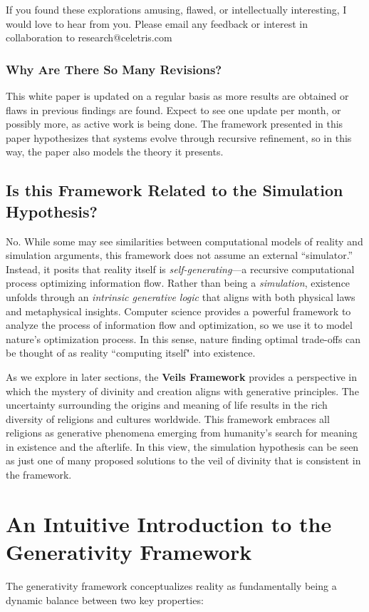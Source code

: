 \documentclass[12pt]{article}
\begin{document}
If you found these explorations amusing, flawed, or intellectually interesting, I would love to hear from you. Please email any feedback or interest in collaboration to research@celetris.com

\subsubsection{Why Are There So Many Revisions?}

This white paper is updated on a regular basis as more results are obtained or flaws in previous findings are found. Expect to see one update per month, or possibly more, as active work is being done. The framework presented in this paper hypothesizes that systems evolve through recursive refinement, so in this way, the paper also models the theory it presents.

\subsection{Is this Framework Related to the Simulation Hypothesis?}
No. While some may see similarities between computational models of reality and simulation arguments, this framework does not assume an external “simulator.” Instead, it posits that reality itself is \textit{self-generating}—a recursive computational process optimizing information flow. Rather than being a \textit{simulation}, existence unfolds through an \textit{intrinsic generative logic} that aligns with both physical laws and metaphysical insights. Computer science provides a powerful framework to analyze the process of information flow and optimization, so we use it to model nature's optimization process. In this sense, nature finding optimal trade-offs can be thought of as reality ``computing itself" into existence.

As we explore in later sections, the \textbf{Veils Framework} provides a perspective in which the mystery of divinity and creation aligns with generative principles. The uncertainty surrounding the origins and meaning of life results in the rich diversity of religions and cultures worldwide. This framework embraces all religions as generative phenomena emerging from humanity's search for meaning in existence and the afterlife. In this view, the simulation hypothesis can be seen as just one of many proposed solutions to the veil of divinity that is consistent in the framework.


\section{An Intuitive Introduction to the Generativity Framework}
The generativity framework conceptualizes reality as fundamentally being a dynamic balance between two key properties:
\end{document}
